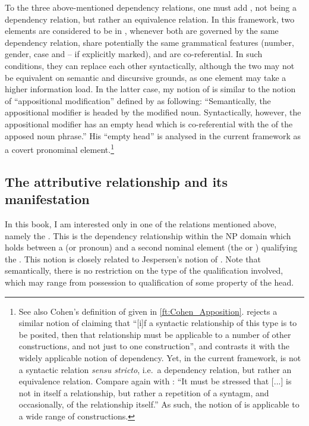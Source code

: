 To the three above-mentioned dependency relations, one must add , not being a dependency relation, but rather an equivalence relation. In this framework, two elements are considered to be in , whenever both are governed by the same dependency relation, share potentially the same grammatical features (number, gender, case and  -- if explicitly marked), and are co-referential. In such conditions, they can replace each other syntactically, although the two may not be equivalent on semantic and discursive grounds, as one element may take a higher information load. In the latter case, my notion of  is similar to the notion of \enquote{appositional modification} defined by \citet[13]{Riessler} as following: \enquote{Semantically, the appositional modifier is headed by the modified noun.
Syntactically, however, the appositional modifier has an empty head which is
co-referential with the  of the apposed noun phrase.} His \enquote{empty head} is analysed in the current framework as a covert pronominal element.\footnote{See also Cohen's definition of  given in \vref{ft:Cohen_Apposition}. \citet[65]{Acuna-Farina1999} rejects a similar notion of  claiming that \enquote{[i]f a syntactic relationship of this type is to be posited, then that relationship must be applicable to a number of other constructions, and
not just to one construction}, and contrasts it with the widely applicable notion of dependency. Yet, in the current framework,  is not a syntactic relation \textit{sensu stricto}, i.e.\ a dependency relation, but rather an equivalence relation. Compare again with \citet[38]{CohenSha}: \enquote{It must be stressed that  [...] is not in itself a relationship, but rather a repetition of a syntagm, and occasionally, of the relationship itself.} As such, the notion of  is applicable to a wide range of constructions.}

\subsection{The attributive relationship and its manifestation}
\label{ss:attr_relation}

In this book, I am interested only in one of the relations mentioned above, namely the . This is the dependency relationship within the NP domain which holds between a  (or pronoun) and a second nominal element (the  or ) qualifying the  \parencites(cf.)()[1--2]{GoldenbergAttribution}{CohenAttribute}. This notion is closely related to Jespersen's notion of  \citep[Ch.\ 8]{JespersenPhilosophy}. Note that semantically, there is no restriction on the type of the qualification involved, which may range from possession to qualification of some property of the head. 



